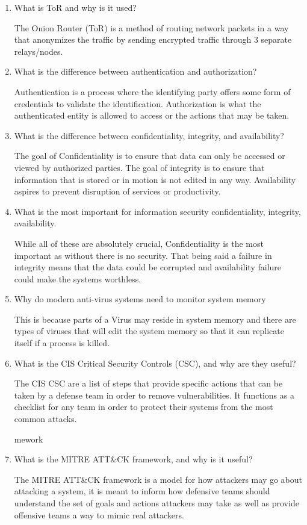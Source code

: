 \documentclass{exam}
\begin{document}
\begin{enumerate}
	\item What is ToR and why is it used?
	\begin{solution}
		The Onion Router (ToR) is a method of routing network packets in a way that anonymizes the traffic by sending encrypted traffic through 3 separate relays/nodes.  
	\end{solution}
	\item What is the difference between authentication and authorization?
	\begin{solution}
		Authentication is a process where the identifying party offers some form of credentials to validate the identification. Authorization is what the authenticated entity is allowed to access or the actions that may be taken. 
	\end{solution}
	\item What is the difference between confidentiality, integrity, and availability?
	\begin{solution}
		The goal of Confidentiality is to ensure that data can only be accessed or viewed by authorized parties. The goal of integrity is to ensure that information that is stored or in motion is not edited in any way. Availability aspires to prevent disruption of services or productivity. 
	\end{solution}
	\item What is the most important for information security confidentiality, integrity, availability. 
	\begin{solution}
		While all of these are absolutely crucial, Confidentiality is the most important as without there is no security. That being said a failure in integrity means that the data could be corrupted and availability failure could make the systems worthless. 
	\end{solution}
	\item Why do modern anti-virus systems need to monitor system memory
	\begin{solution}
		This is because parts of a Virus may reside in system memory and there are types of viruses that will edit the system memory so that it can replicate itself if a process is killed. 
	\end{solution}
	\item What is the CIS Critical Security Controls (CSC), and why are they useful?
	\begin{solution}
		The CIS CSC are a list of steps that provide specific actions that can be taken by a defense team in order to remove vulnerabilities. It functions as a checklist for any team in order to protect their systems from the most common attacks. 
		
	\end{solution}
mework 	\item What is the MITRE ATT\&CK framework, and why is it useful?
	\begin{solution}
		The MITRE ATT\&CK framework is a model for how attackers may go about attacking a system, it is meant to inform how defensive teams should understand the set of goals and actions attackers may take as well as provide offensive teams a way to mimic real attackers. 
	\end{solution}
	\end{enumerate}
\end{document}
